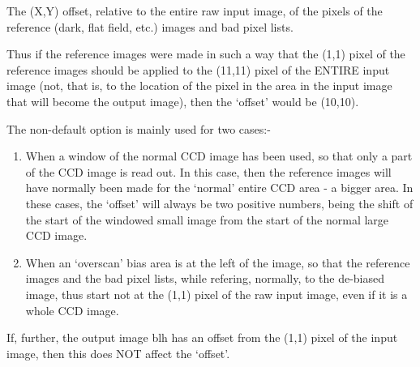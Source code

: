 \begin{small}
{{{  The (X,Y) offset, relative to the entire raw input image, of the
  pixels of the reference (dark, flat field, etc.) images and bad
  pixel lists.

  Thus if the reference images were made in such a way that the (1,1)
  pixel of the reference images should be applied to the (11,11) pixel
  of the ENTIRE input image (not, that is, to the location of the
  pixel in the area in the input image that will become the output
  image), then the `offset' would be (10,10).

  The non-default option is mainly used for two cases:-

 \begin{enumerate}

 \item When a window of the normal CCD image has been used, so that only
     a part of the CCD image is read out. In this case, then the
     reference images will have normally been made for the `normal'
     entire CCD area - a bigger area. In these cases, the `offset'
     will always be two positive numbers, being the shift of the start
     of the windowed small image from the start of the normal large
     CCD image.

 \item When an `overscan' bias area is at the left of the image, so that
     the reference images and the bad pixel lists, while refering,
     normally, to the de-biased image, thus start not at the (1,1)
     pixel of the raw input image, even if it is a whole CCD image.

 \end{enumerate}

  If, further, the output image blh has an offset from the (1,1) pixel
  of the input image, then this does NOT affect the `offset'.

}}}
\end{small}
